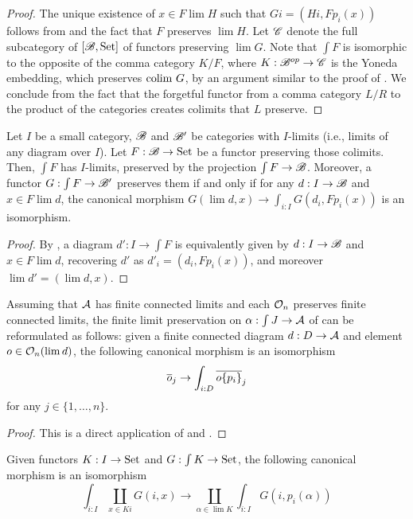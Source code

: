 \begin{proof}
The unique existence of $x\in F\lim H$ such that $Gi=(Hi,Fp_{i}(x))$
follows from  and the fact that $F$ preserves
$\lim H$. Let $\C$ denote the full subcategory of $[\B,\Set]$ of
functors preserving $\lim G$. Note that $\int F$ is isomorphic to
the opposite of the comma category $K/F$, where $K:\op{\B}\rightarrow\C$
is the Yoneda embedding, which preserves $\colim G$, by an argument
similar to the proof of . We conclude
from the fact that the forgetful functor from a comma category $L/R$
to the product of the categories creates colimits that $L$ preserve. 
\end{proof}
%
\begin{corollary}
\label{cor:preserves-elt}Let $I$ be a small category, $\B$ and
$\B'$ be categories with $I$-limits (i.e., limits of any diagram
over $I$). Let $F:\B\rightarrow\Set$ be a functor preserving those
colimits. Then, $\int F$ has $I$-limits, preserved by the projection
$\int F\rightarrow\B$. Moreover, a functor $G:\int F\rightarrow\B'$
preserves them if and only if for any $d:I\rightarrow\B$ and $x\in F\lim d$,
the canonical morphism $G(\lim d,x)\rightarrow\int_{i:I}G(d_{i},Fp_{i}(x))$
is an isomorphism.
\end{corollary}
\begin{proof}
By , a diagram $d':I\rightarrow\int F$ is equivalently
given by $d:I\rightarrow\B$ and $x\in F\lim d$, recovering $d'$
as $d'_{i}=(d_{i},Fp_{i}(x))$, and moreover $\lim d'=(\lim d,x)$. 
\end{proof}
\begin{corollary}
\label{cor:can-iso-app}Assuming that ${\cal A}$ has finite connected
limits and each $\Oby n$ preserves finite connected limits, the finite
limit preservation on $\alpha:\int J\rightarrow{\cal A}$ of 
can be reformulated as follows: given a finite connected diagram $d:D\rightarrow{\cal A}$
and element $o\in\Oop n{\lim d}$, the following canonical morphism
is an isomorphism
\[
\nthar oj\rightarrow\int_{i:D}\nthar{\rename o{p_{i}}}j
\]
for any $j\in\{1,\dots,n\}$.
\end{corollary}
\begin{proof}
This is a direct application of  and .
\end{proof}
%
\begin{lemma}
\label{lem:lim-commute-dependent-pairs}Given
functors $K:I\rightarrow\Set$ and $G:\int K\rightarrow\Set$, the
following canonical morphism is an isomorphism
\[
\int_{i:I}\coprod_{x\in Ki}G(i,x)\rightarrow\coprod_{\alpha\in\lim K}\int_{i:I}G(i,p_{i}(\alpha))
\]
\end{lemma}
